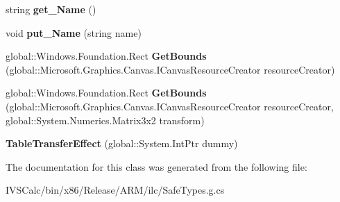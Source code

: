 \begin{DoxyCompactItemize}
\item 
\mbox{\label{class_microsoft_1_1_graphics_1_1_canvas_1_1_effects_1_1_table_transfer_effect_aaea984b6bd7308873e3cb30f37df354f}} 
string {\bfseries get\+\_\+\+Name} ()
\item 
\mbox{\label{class_microsoft_1_1_graphics_1_1_canvas_1_1_effects_1_1_table_transfer_effect_ab3ddf2e399cb1acbd782f786aaacc579}} 
void {\bfseries put\+\_\+\+Name} (string name)
\item 
\mbox{\label{class_microsoft_1_1_graphics_1_1_canvas_1_1_effects_1_1_table_transfer_effect_a1837f2092a2f7df44f26878cf6531baa}} 
global\+::\+Windows.\+Foundation.\+Rect {\bfseries Get\+Bounds} (global\+::\+Microsoft.\+Graphics.\+Canvas.\+I\+Canvas\+Resource\+Creator resource\+Creator)
\item 
\mbox{\label{class_microsoft_1_1_graphics_1_1_canvas_1_1_effects_1_1_table_transfer_effect_a5a75b3c4d1c9d7dc01364dfbe795eb03}} 
global\+::\+Windows.\+Foundation.\+Rect {\bfseries Get\+Bounds} (global\+::\+Microsoft.\+Graphics.\+Canvas.\+I\+Canvas\+Resource\+Creator resource\+Creator, global\+::\+System.\+Numerics.\+Matrix3x2 transform)
\item 
\mbox{\label{class_microsoft_1_1_graphics_1_1_canvas_1_1_effects_1_1_table_transfer_effect_a00f1866e148048c12db7d9cd6835a5c6}} 
{\bfseries Table\+Transfer\+Effect} (global\+::\+System.\+Int\+Ptr dummy)
\end{DoxyCompactItemize}


The documentation for this class was generated from the following file\+:\begin{DoxyCompactItemize}
\item 
I\+V\+S\+Calc/bin/x86/\+Release/\+A\+R\+M/ilc/Safe\+Types.\+g.\+cs\end{DoxyCompactItemize}
